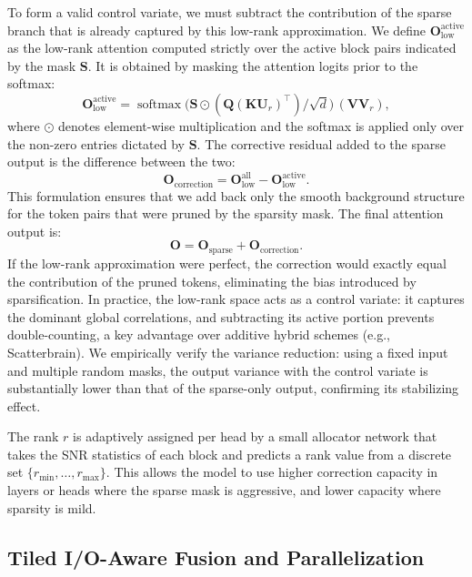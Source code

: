 \documentclass{article}
\begin{document}
To form a valid control variate, we must subtract the contribution of the sparse branch that is already captured by this low-rank approximation. We define $\mathbf{O}_{\text{low}}^{\text{active}}$ as the low-rank attention computed strictly over the active block pairs indicated by the mask $\mathbf{S}$. It is obtained by masking the attention logits prior to the softmax:
\begin{equation}
    \mathbf{O}_{\text{low}}^{\text{active}} = \operatorname{softmax}\!\big(\mathbf{S} \odot (\mathbf{Q}(\mathbf{K}\mathbf{U}_r)^{\top})/\sqrt{d}\big) \, (\mathbf{V}\mathbf{V}_r),
\end{equation}
where $\odot$ denotes element-wise multiplication and the softmax is applied only over the non-zero entries dictated by $\mathbf{S}$. The corrective residual added to the sparse output is the difference between the two:
\begin{equation}
    \mathbf{O}_{\text{correction}} = \mathbf{O}_{\text{low}}^{\text{all}} - \mathbf{O}_{\text{low}}^{\text{active}}.
\end{equation}
This formulation ensures that we add back only the smooth background structure for the token pairs that were pruned by the sparsity mask. The final attention output is:
\begin{equation}
    \mathbf{O} = \mathbf{O}_{\text{sparse}} + \mathbf{O}_{\text{correction}}.
\end{equation}
If the low-rank approximation were perfect, the correction would exactly equal the contribution of the pruned tokens, eliminating the bias introduced by sparsification. In practice, the low-rank space acts as a control variate: it captures the dominant global correlations, and subtracting its active portion prevents double-counting, a key advantage over additive hybrid schemes (e.g., Scatterbrain). We empirically verify the variance reduction: using a fixed input and multiple random masks, the output variance with the control variate is substantially lower than that of the sparse-only output, confirming its stabilizing effect.

The rank $r$ is adaptively assigned per head by a small allocator network that takes the SNR statistics of each block and predicts a rank value from a discrete set $\{r_{\min},\dots,r_{\max}\}$. This allows the model to use higher correction capacity in layers or heads where the sparse mask is aggressive, and lower capacity where sparsity is mild.

\subsection{Tiled I/O-Aware Fusion and Parallelization}
\end{document}
